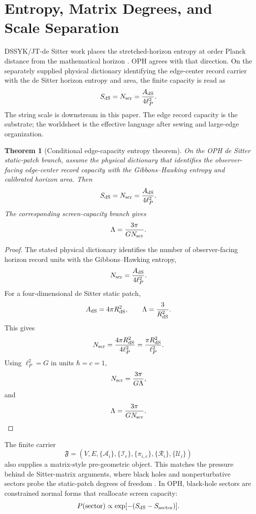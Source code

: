 \documentclass[11pt]{article}
\newtheorem{theorem}{Theorem}[section]
\theoremstyle{remark}
\theoremstyle{plain}
\newcommand{\calA}{\mathcal A}
\newcommand{\calR}{\mathcal R}
\newcommand{\calI}{\mathcal I}
\newcommand{\calU}{\mathcal U}
\begin{document}
\section{Entropy, Matrix Degrees, and Scale Separation}

DSSYK/JT-de Sitter work places the stretched-horizon entropy at order Planck distance
from the mathematical horizon \cite{DSEntropy2025}. OPH agrees with that direction. On the
separately supplied physical dictionary identifying the edge-center record carrier with the
de Sitter horizon entropy and area, the finite capacity is read as
\[
S_{\rm dS}=N_{\rm scr}=\frac{A_{\rm dS}}{4\ell_P^2}.
\]
The string scale is downstream in this paper. The edge record capacity is the substrate; the
worldsheet is the effective language after sewing and large-edge organization.

\begin{theorem}[Conditional edge-capacity entropy theorem]
On the OPH de Sitter static-patch branch, assume the physical dictionary that identifies
the observer-facing edge-center record capacity with the Gibbons--Hawking entropy and
calibrated horizon area. Then
\[
S_{\rm dS}=N_{\rm scr}=\frac{A_{\rm dS}}{4\ell_P^2}.
\]
The corresponding screen-capacity branch gives
\[
\Lambda=\frac{3\pi}{G N_{\rm scr}}.
\]
\end{theorem}

\begin{proof}
The stated physical dictionary identifies the number of observer-facing horizon record units with
the Gibbons--Hawking entropy,
\[
N_{\rm scr}=\frac{A_{\rm dS}}{4\ell_P^2}.
\]
For a four-dimensional de Sitter static patch,
\[
A_{\rm dS}=4\pi R_{\rm dS}^2,
\qquad
\Lambda=\frac{3}{R_{\rm dS}^2}.
\]
This gives
\[
N_{\rm scr}=\frac{4\pi R_{\rm dS}^2}{4\ell_P^2}
=\frac{\pi R_{\rm dS}^2}{\ell_P^2}.
\]
Using \(\ell_P^2=G\) in units \(\hbar=c=1\),
\[
N_{\rm scr}=\frac{3\pi}{G\Lambda},
\]
and
\[
\Lambda=\frac{3\pi}{G N_{\rm scr}}.
\]
\end{proof}

The finite carrier
\[
\mathfrak F=(V,E,\{\calA_i\},\{\calI_e\},\{\pi_{i,e}\},\{\calR_i\},\{\calU_i\})
\]
also supplies a matrix-style pre-geometric object. This matches the pressure behind de
Sitter-matrix arguments, where black holes and nonperturbative sectors probe the static-patch
degrees of freedom \cite{DSMatrix2021}. In OPH, black-hole sectors are constrained normal
forms that reallocate screen capacity:
\[
P(\text{sector})\propto
\exp[-(S_{\rm dS}-S_{\rm sector})].
\]
\end{document}
